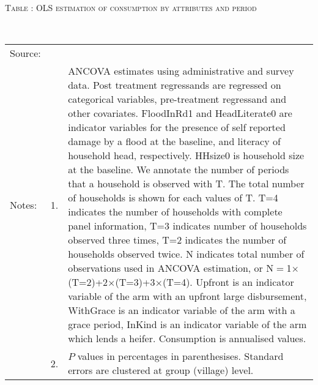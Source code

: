 \hspace{-1cm}\begin{minipage}[t]{14cm}
\hfil\textsc{\normalsize Table \thetable: OLS estimation of consumption by attributes and period\label{tab ANCOVA consumption timevarying attributes original HH}}\\
\setlength{\tabcolsep}{1pt}
\setlength{\baselineskip}{8pt}
\renewcommand{\arraystretch}{.55}
\hfil{}\\
\renewcommand{\arraystretch}{.8}
\setlength{\tabcolsep}{1pt}
\begin{tabular}{>{\hfill\scriptsize}p{1cm}<{}>{\hfill\scriptsize}p{.25cm}<{}>{\scriptsize}p{12cm}<{\hfill}}
Source:& \multicolumn{2}{l}{\scriptsize Estimated with GUK administrative and survey data.}\\
Notes: & 1. & ANCOVA estimates using administrative and survey data. Post treatment regressands are regressed on categorical variables, pre-treatment regressand and other covariates. \textsf{FloodInRd1} and \textsf{HeadLiterate0} are indicator variables for the presence of self reported damage by a flood at the baseline, and literacy of household head, respectively. \textsf{HHsize0} is household size at the baseline. We annotate the number of periods that a household is observed with \textsf{T}. The total number of households is shown for each values of \textsf{T}. \textsf{T=4} indicates the number of households with complete panel information, \textsf{T=3} indicates number of households observed three times, \textsf{T=2} indicates the number of households observed twice. \textsf{N} indicates total number of observations used in ANCOVA estimation, or \textsf{N$=$1$\times$(T=2)+2$\times$(T=3)+3$\times$(T=4)}.  \textsf{Upfront} is an indicator variable of the arm with an upfront large disbursement, \textsf{WithGrace} is an indicator variable of the arm with a grace period, \textsf{InKind} is an indicator variable of the arm which lends a heifer. Consumption is annualised values. \\
& 2. & $P$ values in percentages in parenthesises. Standard errors are clustered at group (village) level.
\end{tabular}
\end{minipage}




